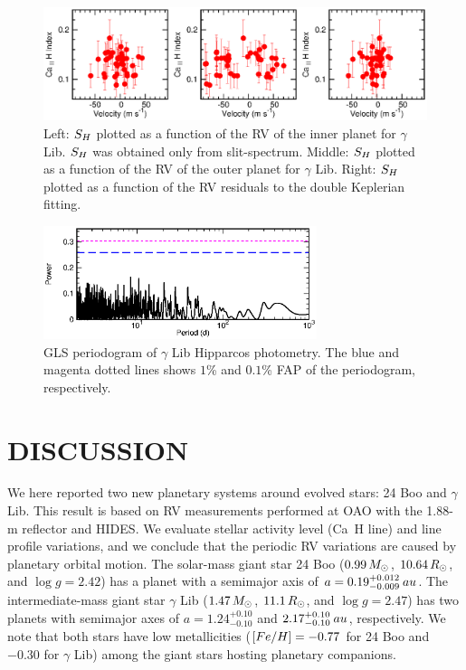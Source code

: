 \documentclass[]{pasj01}
\begin{document}
\begin{figure}
\begin{center}
\includegraphics[width=14cm]{re_rv_resi_cahk_138905.v2.eps}
\end{center}
\caption{Left: $S_{\rm H}$ plotted as a function of the RV of the inner planet for $\gamma$ Lib. $S_{\rm H}$ was obtained only from slit-spectrum. Middle: $S_{\rm{H}}$ plotted as a function of the RV of the outer planet for $\gamma$ Lib. Right: $S_{\rm H}$ plotted as a function of the RV residuals to the double Keplerian fitting.}
\label{re_rv_cahk_138905}
\end{figure}

\begin{figure}
\begin{center}
\includegraphics[width=8cm]{re_peri_hip_138.eps}
\end{center}
\caption{GLS periodogram of $\gamma$ Lib Hipparcos photometry. The blue and magenta dotted lines shows $1$\% and $0.1$\% FAP of the periodogram, respectively.}
\label{re_peri_hip_138905}
\end{figure}

\section{DISCUSSION}
We here reported two new planetary systems around evolved stars: 24 Boo and $\gamma$ Lib.
This result is based on RV measurements performed at OAO with the 1.88-m reflector and HIDES.
We evaluate stellar activity level (Ca\, H line) and line profile variations, and we conclude that the periodic RV variations are caused by planetary orbital motion.
The solar-mass giant star 24 Boo ($0.99\,M_{\Sol}$, $10.64\,R_{\Sol}$, and $\log g=2.42$) has a planet with a semimajor axis of $a=0.19_{-0.009}^{+0.012}\>{\rm au}$.
The intermediate-mass giant star $\gamma$ Lib ($1.47\,M_{\Sol}$, $11.1\,R_{\Sol}$, and $\log g=2.47$) has two planets with semimajor axes of $a=1.24_{-0.10}^{+0.10}$ and $2.17_{-0.10}^{+0.10}\>{\rm au}$, respectively.
We note that both stars have low metallicities (${\rm [Fe/H]}=-0.77$ for 24 Boo and $-0.30$ for $\gamma$ Lib) among the giant stars hosting planetary companions.
\end{document}
